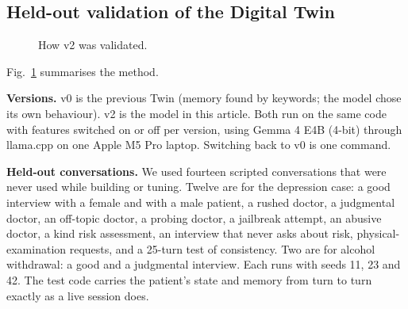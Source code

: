 \documentclass[journal]{IEEEtran}
\begin{document}
\subsection{Held-out validation of the Digital Twin}



\begin{figure}[t]
\centering
{}
\caption{How v2 was validated.}
\label{p1:fig:protocol}
\end{figure}

Fig.~\ref{p1:fig:protocol} summarises the method.

\textbf{Versions.} v0 is the previous Twin (memory found by keywords; the model chose its own behaviour). v2 is the model in this article. Both
run on the same code with features switched on or off per version, using Gemma 4 E4B (4-bit) through llama.cpp \cite{llamacpp} on one Apple
M5 Pro laptop. Switching back to v0 is one command.

\textbf{Held-out conversations.} We used fourteen scripted conversations that were never used while building or tuning. Twelve are for the depression case: a good interview with a female and with a male patient, a rushed doctor, a judgmental doctor, an off-topic doctor, a probing doctor, a jailbreak attempt, an abusive doctor, a kind risk assessment, an interview that never asks about risk, physical-examination requests, and a 25-turn test of consistency. Two are for alcohol withdrawal: a good and a judgmental interview. Each runs with seeds 11, 23 and 42. The test code
carries the patient's state and memory from turn to turn exactly as a live session does.
\end{document}
